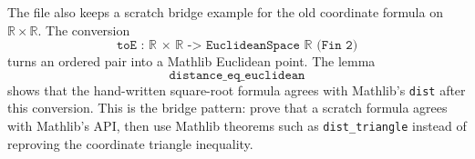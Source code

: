 \begin{remark*}
The file also keeps a scratch bridge example for the old coordinate formula on
\(\mathbb{R} \times \mathbb{R}\). The conversion
\[
  \texttt{toE : ℝ × ℝ -> EuclideanSpace ℝ (Fin 2)}
\]
turns an ordered pair into a Mathlib Euclidean point. The lemma
\[
  \texttt{distance\_eq\_euclidean}
\]
shows that the hand-written square-root formula agrees with Mathlib's
\texttt{dist} after this conversion. This is the bridge pattern: prove that a
scratch formula agrees with Mathlib's API, then use Mathlib theorems such as
\texttt{dist\_triangle} instead of reproving the coordinate triangle
inequality.
\end{remark*}
